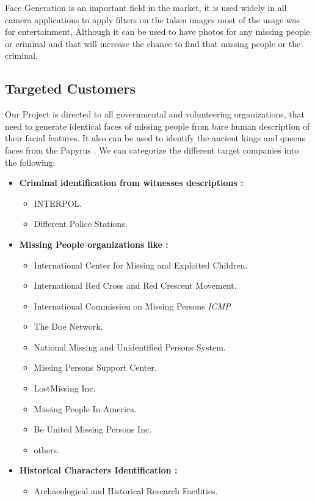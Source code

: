 
Face Generation is an important field in the market, it is used widely in all camera applications to apply filters on the taken images most of the usage was for entertainment, Although it can be used to have photos for any missing people or criminal and that will increase the chance to find that missing people or the criminal.
 
\subsection{Targeted Customers}
Our Project is directed to all governmental and volunteering organizations, that need to generate identical faces of missing people from bare human description of their facial features.
It also can be used to identify the ancient kings and queens faces from the Papyrus .
We can categorize the different target companies into the following:
\begin{itemize}
    \item \textbf{Criminal identification from witnesses descriptions :}
        \begin{itemize}
            \item INTERPOL.
            \item Different Police Stations.
        \end{itemize}
    \item \textbf{Missing People organizations like :}
        \begin{itemize}
            \item International Center for Missing and Exploited Children.
            \item International Red Cross and Red Crescent Movement.
            \item International Commission on Missing Persons \emph{ICMP}
            \item The Doe Network.
            \item National Missing and Unidentified Persons System.
            \item Missing Persons Support Center.
            \item LostMissing Inc.
            \item Missing People In America.
            \item Be United Missing Persons Inc.
            \item others.
        \end{itemize}
    \item \textbf{Historical Characters Identification :}
        \begin{itemize}
            \item Archaeological and Historical Research Facilities.
        \end{itemize}
\end{itemize}

